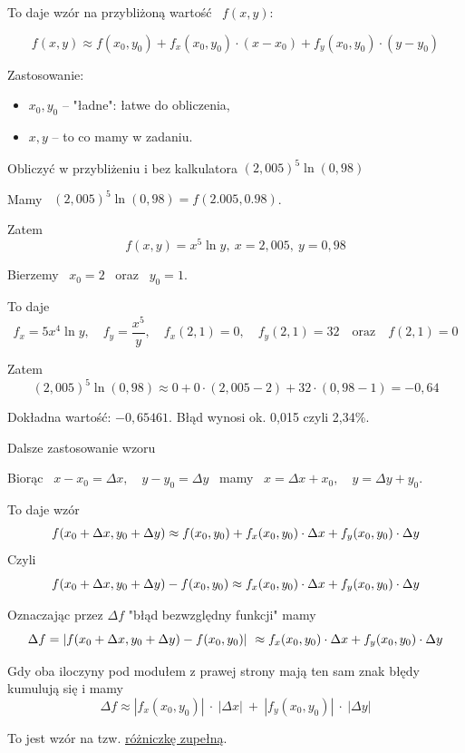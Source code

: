 To daje wzór na przybliżoną wartość \ $f(x,y)$:

\[ f(x,y) \approx f(x_0,y_0) + f_x(x_0, y_0) \cdot (x - x_0 ) + f_y(x_0, y_0) \cdot (y - y_0) \]

Zastosowanie:
\begin{itemize}
    \item $ x_0, y_0 $ -- "ładne": łatwe do obliczenia,
    \item $ x,y $ -- to co mamy w zadaniu.
\end{itemize}

\begin{przyklad}
    Obliczyć w przybliżeniu i bez kalkulatora $ (2,005)^5 \ln(0,98) $ \medskip

    Mamy \ $ (2,005)^5 \ln(0,98) = f(2.005, 0.98) $.

    Zatem
    \[ f(x,y) = x^5 \ln y, \ x = 2,005, \ y = 0,98 \]

    Bierzemy \ $x_0 = 2$ \ oraz \ $ y_0 = 1 $.

    To daje
    \[ f_x = 5x^4 \ln y, \quad f_y = \frac{x^5}{y}, \quad f_x(2,1) = 0, \quad f_y(2,1) = 32 \quad \text{oraz} \quad f(2,1) = 0 \]

    Zatem
    \[ (2,005)^5 \ln (0,98) \approx 0 + 0 \cdot (2,005 - 2) + 32 \cdot(0,98 - 1) = -0,64 \]

    Dokładna wartość: $ -0,65461 $. Błąd wynosi ok. 0,015 czyli 2,34\%.
\end{przyklad}

Dalsze zastosowanie wzoru

Biorąc \ $ x - x_0 = \Delta x, \quad y - y_0 = \Delta y $ \ mamy \ $ x = \Delta x + x_0, \quad y = \Delta y + y_0 $.
\medskip

To daje wzór
\[ f(x_0 + \Delta x, y_0 + \Delta y) \approx f(x_0, y_0) + f_x(x_0, y_0) \cdot \Delta x + f_y(x_0, y_0) \cdot \Delta y \]
Czyli
\[ f(x_0 + \Delta x, y_0 + \Delta y) - f(x_0, y_0) \approx f_x(x_0, y_0) \cdot \Delta x + f_y(x_0, y_0) \cdot \Delta y \]

Oznaczając przez $ \Delta f $ "błąd bezwzględny funkcji" mamy
\[ \Delta f  = | f(x_0 + \Delta x ,y_0 + \Delta y) - f(x_0, y_0) | \ \approx f_x(x_0, y_0) \cdot \Delta x + f_y(x_0, y_0) \cdot \Delta y \]

Gdy oba iloczyny pod modułem z prawej strony mają ten sam znak błędy kumulują się i mamy
\[ \Delta f \approx | f_x(x_0, y_0) | \ \cdot \ | \Delta x | \ + \ | f_y(x_0, y_0) | \ \cdot \ | \Delta y | \]

To jest wzór na tzw. \underline{różniczkę zupełną}.

